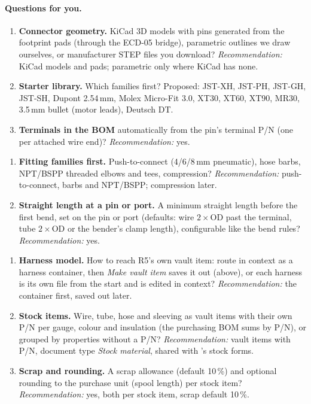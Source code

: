 \paragraph{Questions for you.}
\begin{enumerate}[label=C\arabic*.]
  \item \textbf{Connector geometry.} KiCad 3D models with pins generated from the footprint pads (through
        the ECD-05 bridge), parametric outlines we draw ourselves, or manufacturer STEP files you download?
        \emph{Recommendation:} KiCad models and pads; parametric only where KiCad has none.
  \item \textbf{Starter library.} Which families first? Proposed: JST-XH, JST-PH, JST-GH, JST-SH, Dupont
        2.54\,mm, Molex Micro-Fit 3.0, XT30, XT60, XT90, MR30, 3.5\,mm bullet (motor leads), Deutsch DT.
  \item \textbf{Terminals in the BOM} automatically from the pin's terminal P/N (one per attached wire end)?
        \emph{Recommendation:} yes.
\end{enumerate}
\begin{enumerate}[label=F\arabic*.]
  \item \textbf{Fitting families first.} Push-to-connect (4/6/8\,mm pneumatic), hose barbs, NPT/BSPP threaded
        elbows and tees, compression? \emph{Recommendation:} push-to-connect, barbs and NPT/BSPP; compression
        later.
  \item \textbf{Straight length at a pin or port.} A minimum straight length before the first bend, set on the
        pin or port (defaults: wire $2\times$OD past the terminal, tube $2\times$OD or the bender's clamp
        length), configurable like the bend rules? \emph{Recommendation:} yes.
\end{enumerate}
\begin{enumerate}[label=V\arabic*.]
  \item \textbf{Harness model.} How to reach R5's own vault item: route in context as a harness container,
        then \emph{Make vault item} saves it out (above), or each harness is its own file from the start and is
        edited in context?
        \emph{Recommendation:} the container first, saved out later.
  \item \textbf{Stock items.} Wire, tube, hose and sleeving as vault items with their own P/N per gauge,
        colour and insulation (the purchasing BOM sums by P/N), or grouped by properties without a P/N?
        \emph{Recommendation:} vault items with P/N, document type \emph{Stock material}, shared with
        's stock forms.
  \item \textbf{Scrap and rounding.} A scrap allowance (default 10\,\%) and optional rounding to the purchase
        unit (spool length) per stock item? \emph{Recommendation:} yes, both per stock item, scrap default
        10\,\%.
\end{enumerate}

